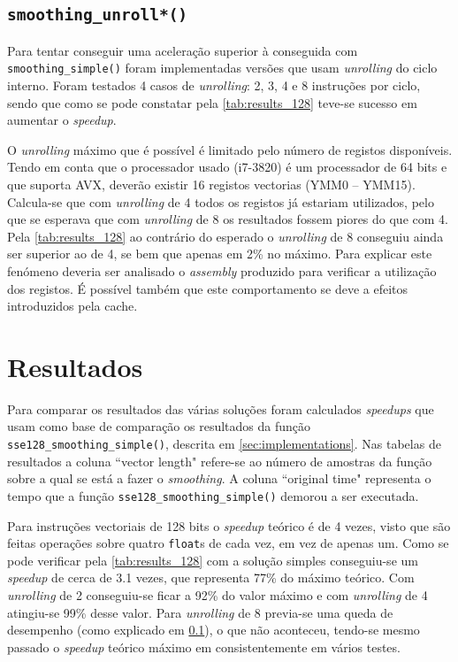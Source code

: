 \documentclass[a4paper]{article}
\begin{document}
	
	\subsection{\texttt{smoothing\_unroll*()}}
	\label{subsec:implementation_unrolling}
	
	Para tentar conseguir uma aceleração superior à conseguida com \texttt{smoothing\_simple()} foram implementadas versões que usam \textit{unrolling} do ciclo interno. Foram testados 4 casos de \textit{unrolling}: 2, 3, 4 e 8 instruções por ciclo, sendo que como se pode constatar pela \autoref{tab:results_128} teve-se sucesso em aumentar o \textit{speedup}.
	
	O \textit{unrolling} máximo que é possível é limitado pelo número de registos disponíveis. Tendo em conta que o processador usado (i7-3820) é um processador de 64 bits e que suporta AVX, deverão existir 16 registos vectorias (YMM0 -- YMM15). Calcula-se que com \textit{unrolling} de 4 todos os registos já estariam utilizados, pelo que se esperava que com \textit{unrolling} de 8 os resultados fossem piores do que com 4. Pela \autoref{tab:results_128} ao contrário do esperado o \textit{unrolling} de 8 conseguiu ainda ser superior ao de 4, se bem que apenas em 2\% no máximo. Para explicar este fenómeno deveria ser analisado o \textit{assembly} produzido para verificar a utilização dos registos. É possível também que este comportamento se deve a efeitos introduzidos pela cache.
	
	
	\section{Resultados} 
	
	Para comparar os resultados das várias soluções foram calculados \textit{speedups} que usam como base de comparação os resultados da função \texttt{sse128\_smoothing\_simple()}, descrita em \ref{sec:implementations}. Nas tabelas de resultados a coluna ``vector length" refere-se ao número de amostras da função sobre a qual se está a fazer o \textit{smoothing}. A coluna ``original time" representa o tempo que a função \texttt{sse128\_smoothing\_simple()} demorou a ser executada.
	
	Para instruções vectoriais de 128 bits o \textit{speedup} teórico é de 4 vezes, visto que são feitas operações sobre quatro \texttt{float}s de cada vez, em vez de apenas um. Como se pode verificar pela \autoref{tab:results_128} com a solução simples conseguiu-se um \textit{speedup} de cerca de 3.1 vezes, que representa 77\% do máximo teórico. Com \textit{unrolling} de 2 conseguiu-se ficar a 92\% do valor máximo e com \textit{unrolling} de 4 atingiu-se 99\% desse valor. Para \textit{unrolling} de 8 previa-se uma queda de desempenho (como explicado em \ref{subsec:implementation_unrolling}), o que não aconteceu, tendo-se mesmo passado o \textit{speedup} teórico máximo em consistentemente em vários testes.
	
\end{document}
